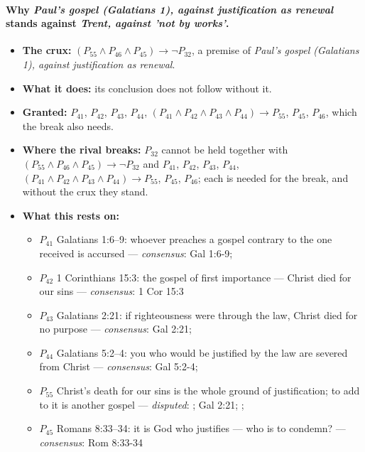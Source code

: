 \documentclass[11pt]{article}
\begin{document}
\paragraph{Why \emph{Paul's gospel (Galatians 1), against justification as renewal} stands against \emph{Trent, against 'not by works'}.}
\begin{itemize}
\item \textbf{The crux:} \((P_{55} \land P_{46} \land P_{45}) \rightarrow \lnot P_{32}\), a premise of \emph{Paul's gospel (Galatians 1), against justification as renewal}.
\item \textbf{What it does:} its conclusion does not follow without it.
\item \textbf{Granted:} \(P_{41}\), \(P_{42}\), \(P_{43}\), \(P_{44}\), \((P_{41} \land P_{42} \land P_{43} \land P_{44}) \rightarrow P_{55}\), \(P_{45}\), \(P_{46}\), which the break also needs.
\item \textbf{Where the rival breaks:} \(P_{32}\) cannot be held together with \((P_{55} \land P_{46} \land P_{45}) \rightarrow \lnot P_{32}\) and \(P_{41}\), \(P_{42}\), \(P_{43}\), \(P_{44}\), \((P_{41} \land P_{42} \land P_{43} \land P_{44}) \rightarrow P_{55}\), \(P_{45}\), \(P_{46}\); each is needed for the break, and without the crux they stand.
\item \textbf{What this rests on:}
\begin{itemize}
\item \(P_{41}\) Galatians 1:6–9: whoever preaches a gospel contrary to the one received is accursed --- \emph{consensus}: Gal 1:6-9; \cite[ad loc. Gal 1:6]{moo-galatians-2013}
\item \(P_{42}\) 1 Corinthians 15:3: the gospel of first importance — Christ died for our sins --- \emph{consensus}: 1 Cor 15:3
\item \(P_{43}\) Galatians 2:21: if righteousness were through the law, Christ died for no purpose --- \emph{consensus}: Gal 2:21; \cite[ad loc. Gal 2:21]{moo-galatians-2013}
\item \(P_{44}\) Galatians 5:2–4: you who would be justified by the law are severed from Christ --- \emph{consensus}: Gal 5:2-4; \cite[ad loc. Gal 5:2]{moo-galatians-2013}
\item \(P_{55}\) Christ's death for our sins is the whole ground of justification; to add to it is another gospel --- \emph{disputed}: \cite[XI.1]{westminster-confession-1647}; Gal 2:21; \cite[ad loc. Gal 2:21]{moo-galatians-2013}; \cite[Epistle to Diognetus 9]{roberts-ante-nicene-fathers-1-1885}
\item \(P_{45}\) Romans 8:33–34: it is God who justifies — who is to condemn? --- \emph{consensus}: Rom 8:33-34

\end{itemize}
\end{itemize}
\end{document}
